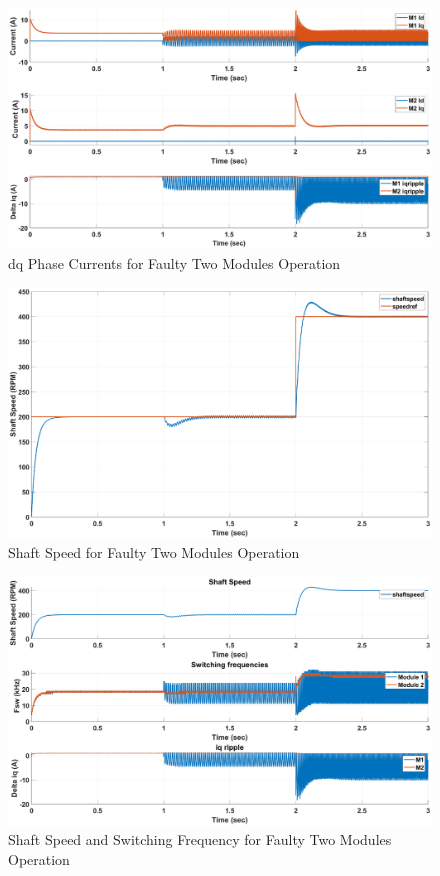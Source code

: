 \documentclass{article}
\begin{document}
\begin{figure}[H]
\centering
\includegraphics[scale=0.35]{SimulationResults/two_modules/faulty/Idq_iqripple.eps}
\caption{dq Phase Currents for Faulty Two Modules Operation}
\label{fig:PhaseCurrentsDqTwoModulesFaulty}
\end{figure}

\begin{figure}[H]
\centering
\includegraphics[scale=0.35]{SimulationResults/two_modules/faulty/speed.eps}
\caption{Shaft Speed for Faulty Two Modules Operation}
\label{fig:ShaftSpeedTwoModulesFaulty}
\end{figure}

\begin{figure}[H]
\centering
\includegraphics[scale=0.35]{SimulationResults/two_modules/faulty/speed_fsw_iqripple.eps}
\caption{Shaft Speed and Switching Frequency for Faulty Two Modules Operation}
\label{fig:ShaftSpeedFswIqRippleTwoModulesFaulty}
\end{figure}
\end{document}
